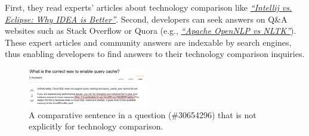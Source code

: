 First, they read experts' articles about technology comparison like \href{https://dzone.com/articles/why-idea-better-eclipse}{\textit{``Intellij vs. Eclipse: Why IDEA is Better''}}.
Second, developers can seek answers on Q\&A websites such as Stack Overflow or Quora (e.g., \href{https://stackoverflow.com/questions/47011991/apache-open-nlp-vs-nltk}{\textit{``Apache OpenNLP vs NLTK''}}).
These expert articles and community answers are indexable by search engines, thus enabling developers to find answers to their technology comparison inquiries.

\begin{figure}
	\centering
	\includegraphics[width=0.47\textwidth]{figures/fig1.pdf}
	
	\vspace{-5mm}
	\caption{A comparative sentence in a question (\#30654296) that is not explicitly for technology comparison.}
	\label{fig:example}
	\vspace{-3mm}
\end{figure}

